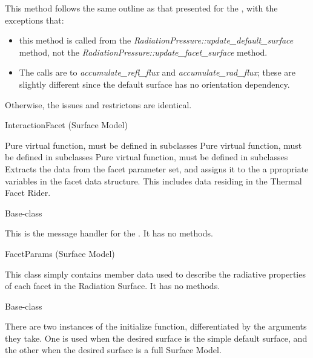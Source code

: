 {\begin{enumerate}
\begin{enumerate}
This method follows the same outline as that presented for the
, with the
exceptions that:

\begin{itemize}
 \item this method is called from the
 \textit{RadiationPressure::update\_default\_surface} method, not the
 \textit{RadiationPressure::update\_facet\_surface} method.
 \item The calls are to \textit{accumulate\_refl\_flux} and
 \textit{accumulate\_rad\_flux}; these are slightly different since the default
 surface has no orientation dependency.
\end{itemize}

Otherwise, the issues and restrictons are identical.
\end{enumerate}


 InteractionFacet (Surface Model)


\begin{enumerate}

   Pure virtual function, must be defined in subclasses
   Pure virtual function, must be defined in subclasses
    Pure virtual function, must be defined in subclasses
Extracts the data from the facet parameter set, and assigns it to the a
ppropriate variables in the facet data structure.  This includes data residing
in the Thermal Facet Rider.

\end{enumerate}


 Base-class

This is the message handler for the \RadiationPressureDesc.  It has no methods.

FacetParams (Surface Model)

This class simply contains member data used to describe the radiative
properties of each facet in the Radiation Surface.  It has no methods.


 Base-class


{\begin{enumerate}

There are two instances of the initialize function, differentiated by the
arguments they take.  One is used when the desired surface is the simple
default surface, and the other when the desired surface is a full Surface Model.


\end{enumerate}}
\end{enumerate}}
